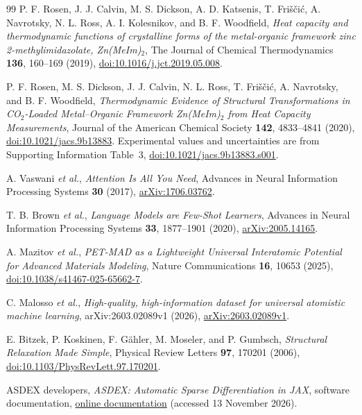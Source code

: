 \documentclass[12pt,a4paper]{article}
\numberwithin{equation}{section}
\begin{document}
\begin{thebibliography}{99}
P. F. Rosen, J. J. Calvin, M. S. Dickson, A. D. Katsenis,
T. Fri\v{s}\v{c}i\'c, A. Navrotsky, N. L. Ross, A. I. Kolesnikov,
and B. F. Woodfield,
\emph{Heat capacity and thermodynamic functions of crystalline forms of the
metal-organic framework zinc 2-methylimidazolate, Zn(MeIm)$_2$},
The Journal of Chemical Thermodynamics \textbf{136}, 160--169 (2019),
\href{https://doi.org/10.1016/j.jct.2019.05.008}{doi:10.1016/j.jct.2019.05.008}.

P. F. Rosen, M. S. Dickson, J. J. Calvin, N. L. Ross,
T. Fri\v{s}\v{c}i\'c, A. Navrotsky, and B. F. Woodfield,
\emph{Thermodynamic Evidence of Structural Transformations in CO$_2$-Loaded
Metal--Organic Framework Zn(MeIm)$_2$ from Heat Capacity Measurements},
Journal of the American Chemical Society \textbf{142}, 4833--4841 (2020),
\href{https://doi.org/10.1021/jacs.9b13883}{doi:10.1021/jacs.9b13883}.
Experimental values and uncertainties are from Supporting Information
Table~3, \href{https://doi.org/10.1021/jacs.9b13883.s001}{doi:10.1021/jacs.9b13883.s001}.

A. Vaswani \emph{et al.},
\emph{Attention Is All You Need}, Advances in Neural Information Processing
Systems \textbf{30} (2017),
\href{https://arxiv.org/abs/1706.03762}{arXiv:1706.03762}.

T. B. Brown \emph{et al.},
\emph{Language Models are Few-Shot Learners}, Advances in Neural Information
Processing Systems \textbf{33}, 1877--1901 (2020),
\href{https://arxiv.org/abs/2005.14165}{arXiv:2005.14165}.

A. Mazitov \emph{et al.},
\emph{PET-MAD as a Lightweight Universal Interatomic Potential for Advanced
Materials Modeling}, Nature Communications \textbf{16}, 10653 (2025),
\href{https://doi.org/10.1038/s41467-025-65662-7}{doi:10.1038/s41467-025-65662-7}.

C. Malosso \emph{et al.},
\emph{High-quality, high-information dataset for universal atomistic
machine learning}, arXiv:2603.02089v1 (2026),
\href{https://arxiv.org/abs/2603.02089v1}{arXiv:2603.02089v1}.

E. Bitzek, P. Koskinen, F. G\"ahler, M. Moseler, and P. Gumbsch,
\emph{Structural Relaxation Made Simple}, Physical Review Letters
\textbf{97}, 170201 (2006),
\href{https://doi.org/10.1103/PhysRevLett.97.170201}{doi:10.1103/PhysRevLett.97.170201}.

ASDEX developers, \emph{ASDEX: Automatic Sparse Differentiation in JAX},
software documentation,
\href{https://adrianhill.de/asdex/}{online documentation}
(accessed 13 November 2026).


\end{thebibliography}
\end{document}
